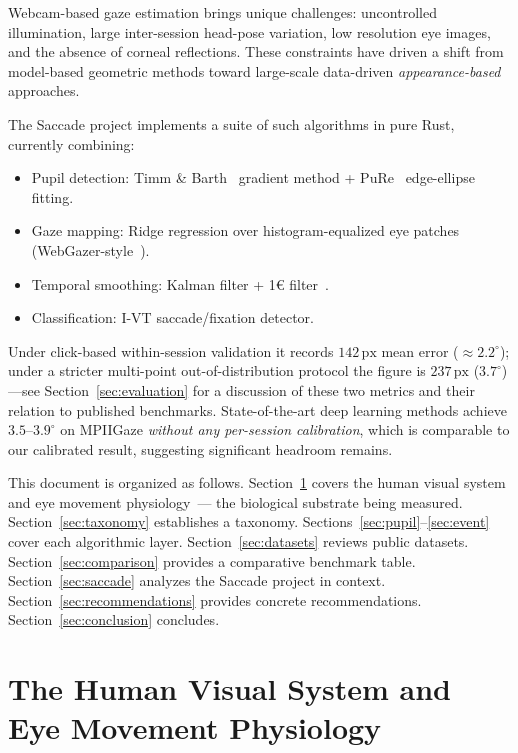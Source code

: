 \documentclass[11pt,a4paper]{article}
\begin{document}
Webcam-based gaze estimation brings unique challenges: uncontrolled illumination, large inter-session head-pose variation, low resolution eye images, and the absence of corneal reflections.
These constraints have driven a shift from model-based geometric methods toward large-scale data-driven \textit{appearance-based} approaches.

The Saccade project implements a suite of such algorithms in pure Rust, currently combining:
\begin{itemize}
  \item Pupil detection: Timm \& Barth~\cite{timm2011accurate} gradient method + PuRe~\cite{santini2018pure} edge-ellipse fitting.
  \item Gaze mapping: Ridge regression over histogram-equalized eye patches (WebGazer-style~\cite{papoutsaki2016webgazer}).
  \item Temporal smoothing: Kalman filter + 1\euro{} filter~\cite{casiez2012oef}.
  \item Classification: I-VT saccade/fixation detector.
\end{itemize}
Under click-based within-session validation it records $142\,\text{px}$ mean error ($\approx 2.2^\circ$); under a stricter multi-point out-of-distribution protocol the figure is $237\,\text{px}$ ($3.7^\circ$)---see Section~\ref{sec:evaluation} for a discussion of these two metrics and their relation to published benchmarks.
State-of-the-art deep learning methods achieve $3.5$--$3.9^\circ$ on MPIIGaze \textit{without any per-session calibration}, which is comparable to our calibrated result, suggesting significant headroom remains.

This document is organized as follows.
Section~\ref{sec:physiology} covers the human visual system and eye movement physiology~--- the biological substrate being measured.
Section~\ref{sec:taxonomy} establishes a taxonomy.
Sections~\ref{sec:pupil}--\ref{sec:event} cover each algorithmic layer.
Section~\ref{sec:datasets} reviews public datasets.
Section~\ref{sec:comparison} provides a comparative benchmark table.
Section~\ref{sec:saccade} analyzes the Saccade project in context.
Section~\ref{sec:recommendations} provides concrete recommendations.
Section~\ref{sec:conclusion} concludes.

\section{The Human Visual System and Eye Movement Physiology}
\label{sec:physiology}
\end{document}
